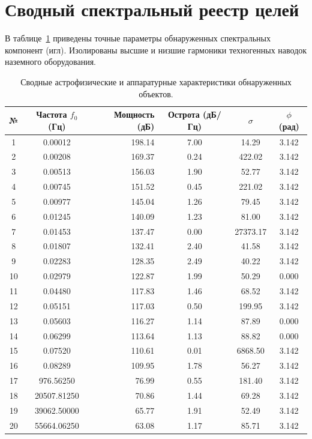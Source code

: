 \documentclass[11pt,twocolumn]{article}
\begin{document}
\section{Сводный спектральный реестр целей}
В таблице~\ref{tab:targets} приведены точные параметры обнаруженных спектральных компонент (игл). 
Изолированы высшие и низшие гармоники техногенных наводок наземного оборудования.\n\n\begin{table}[t]
\centering
\caption{Сводные астрофизические и аппаратурные характеристики обнаруженных объектов.}
\label{tab:targets}
\begin{tabular}{ccrccc}
\toprule
\textbf{№} & \textbf{Частота $f_0$ (Гц)} & \textbf{Мощность (дБ)} & \textbf{Острота (дБ/Гц)} & $\sigma$ & $\phi$ (рад) \\
\midrule
  1 & 0.00012 & 198.14 & 7.00 & 14.29 & 3.142 \\
  2 & 0.00208 & 169.37 & 0.24 & 422.02 & 3.142 \\
  3 & 0.00513 & 156.03 & 1.90 & 52.77 & 3.142 \\
  4 & 0.00745 & 151.52 & 0.45 & 221.02 & 3.142 \\
  5 & 0.00977 & 145.04 & 1.26 & 79.45 & 3.142 \\
  6 & 0.01245 & 140.09 & 1.23 & 81.00 & 3.142 \\
  7 & 0.01453 & 137.47 & 0.00 & 27373.17 & 3.142 \\
  8 & 0.01807 & 132.41 & 2.40 & 41.58 & 3.142 \\
  9 & 0.02283 & 128.35 & 2.49 & 40.22 & 3.142 \\
  10 & 0.02979 & 122.87 & 1.99 & 50.29 & 0.000 \\
  11 & 0.04480 & 117.83 & 1.46 & 68.52 & 3.142 \\
  12 & 0.05151 & 117.03 & 0.50 & 199.95 & 3.142 \\
  13 & 0.05603 & 116.27 & 1.14 & 87.89 & 0.000 \\
  14 & 0.06299 & 113.64 & 1.13 & 88.82 & 0.000 \\
  15 & 0.07520 & 110.61 & 0.01 & 6868.50 & 3.142 \\
  16 & 0.08289 & 109.95 & 1.78 & 56.27 & 3.142 \\
  17 & 976.56250 & 76.99 & 0.55 & 181.40 & 3.142 \\
  18 & 20507.81250 & 70.86 & 1.44 & 69.28 & 3.142 \\
  19 & 39062.50000 & 65.77 & 1.91 & 52.49 & 3.142 \\
  20 & 55664.06250 & 63.08 & 1.17 & 85.71 & 3.142 \\

\end{tabular}
\end{table}
\end{document}
